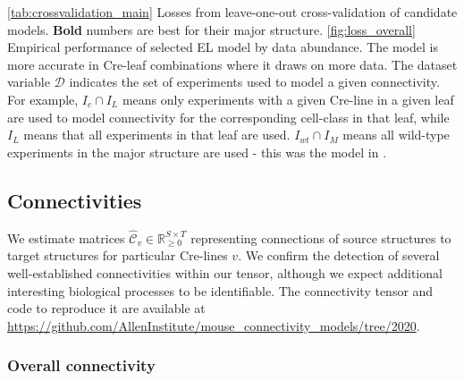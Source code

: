\begin{table}[H]
{\label{tab:crossvalidation_main}
}
\caption{\ref{tab:crossvalidation_main} Losses from leave-one-out cross-validation of candidate models.
\textbf{Bold} numbers are best for their major structure.
\ref{fig:loss_overall} Empirical performance of selected EL model by data abundance.
The model is more accurate in Cre-leaf combinations where it draws on more data.
The dataset variable $\mathcal D$ indicates the set of experiments used to model a given connectivity.
For example, $I_c \cap I_L$ means only experiments with a given Cre-line in a given leaf are used to model connectivity for the corresponding cell-class in that leaf, while $I_L$ means that all experiments in that leaf are used.
$I_{wt} \cap I_M$ means all wild-type experiments in the major structure are used - this was the model in \citet{Knox2019-ot}.}
\end{table}

\subsection{Connectivities}

We estimate matrices $\hat {\mathcal C}_v \in \mathbb R_{\geq 0}^{S \times T}$ representing connections of source structures to target structures for particular Cre-lines $v$. 
We confirm the detection of several well-established connectivities within our tensor, although we expect additional interesting biological processes to be identifiable.
The connectivity tensor and code to reproduce it are available at \url{https://github.com/AllenInstitute/mouse_connectivity_models/tree/2020}.

\subsubsection{Overall connectivity}

